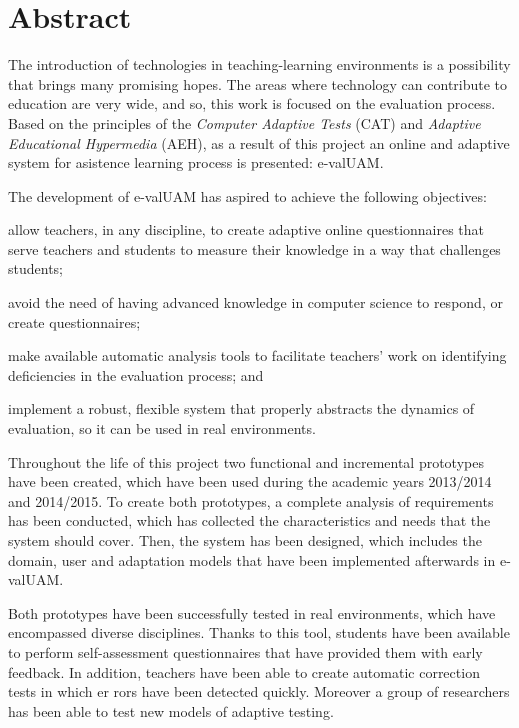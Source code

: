 \chapter*{Abstract}

\begin{abstractEn}
The introduction of technologies in teaching-learning environments is a possibility that brings many promising hopes. The areas where technology can contribute to education are very wide, and so, this work is focused on the evaluation process. Based on the principles of the \textit{Computer Adaptive Tests} (\acrshort {CAT}) and \textit {Adaptive Educational Hypermedia} (\acrshort {AEH}), as a result of this project an online and adaptive system for asistence learning process is presented: e-valUAM.

The development of e-valUAM has aspired to achieve the following objectives:
\begin{enumerate*}[label=\alph*\upshape)]
\item allow teachers, in any discipline, to create adaptive online questionnaires that serve teachers and students to measure their knowledge in a way that challenges students;
\item avoid the need of having advanced knowledge in computer science to respond, or create questionnaires;
\item make available automatic analysis tools to facilitate teachers' work on identifying deficiencies in the evaluation process; and 
\item implement a robust, flexible system that properly abstracts the dynamics of evaluation, so it can be used in real environments.
\end{enumerate*}

Throughout the life of this project two functional and incremental prototypes have been created, which have been used during the academic years 2013/2014 and 2014/2015. To create both prototypes, a complete analysis of requirements has been conducted, which has collected the characteristics and needs that the system should cover. Then, the system has been designed, which includes the domain, user and adaptation models that have been implemented afterwards in e-valUAM.

Both prototypes have been successfully tested in real environments, which have encompassed diverse disciplines. Thanks to this tool, students have been available to perform self-assessment questionnaires that have provided them with early feedback. In addition, teachers have been able to create automatic correction tests in which er rors have been detected quickly. Moreover a group of researchers has been able to test new models of adaptive testing.
\end{abstractEn}

